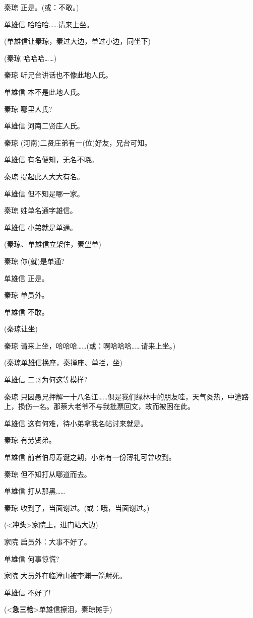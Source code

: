秦琼 正是。(或：不敢。)

单雄信 哈哈哈\ldots{}\ldots{}请来上坐。

(单雄信让秦琼，秦过大边，单过小边，同坐下)

(秦琼 哈哈哈\ldots{}\ldots{})

秦琼 听兄台讲话也不像此地人氏。

单雄信 本不是此地人氏。

秦琼 哪里人氏?

单雄信 河南二贤庄人氏。

秦琼 (河南)二贤庄弟有一(位)好友，兄台可知。

单雄信 有名便知，无名不晓。

秦琼 提起此人大大有名。

单雄信 但不知是哪一家。

秦琼 姓单名通字雄信。

单雄信 小弟就是单通。

(秦琼、单雄信立架住，秦望单)

秦琼 你(就)是单通?

单雄信 正是。

秦琼 单员外。

单雄信 不敢。

(秦琼让坐)

秦琼
请来上坐，哈哈哈\ldots{}\ldots{}(或：啊哈哈哈\ldots{}\ldots{}请来上坐。)

(秦琼单雄信换座，秦掸座、单拦，坐)

单雄信 二哥为何这等模样?

秦琼
只因愚兄押解一十八名江\ldots{}\ldots{}俱是我们绿林中的朋友哇，天气炎热，中途路上，损伤一名。那蔡大老爷不与我批票回文，故而被困在此。

单雄信 这有何难，待小弟拿我名帖讨来就是。

秦琼 有劳贤弟。

单雄信 前者伯母寿诞之期，小弟有一份薄礼可曾收到。

秦琼 但不知打从哪道而去。

单雄信 打从那黑\ldots{}\ldots{}

秦琼 收到了，当面谢过。(或：哦，当面谢过。)

(\textless{}\textbf{冲头}\textgreater{}家院上，进门站大边)

家院 启员外：大事不好了。

单雄信 何事惊慌?

家院 大员外在临潼山被李渊一箭射死。

单雄信 不好了!

(\textless{}\textbf{急三枪}\textgreater{}单雄信擦泪，秦琼摊手)


